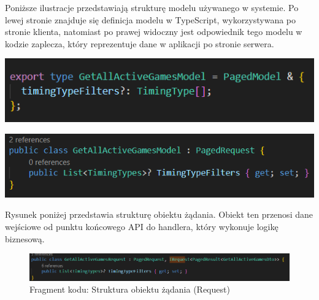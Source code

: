 \documentclass[twoside]{projektInzynierskiMS1}
\begin{document}
\newpage

\noindent
Poniższe ilustracje przedstawiają strukturę modelu używanego w systemie. Po lewej stronie znajduje się definicja modelu w TypeScript, wykorzystywana po stronie klienta, natomiast po prawej widoczny jest odpowiednik tego modelu w kodzie zaplecza, który reprezentuje dane w aplikacji po stronie serwera.

\vspace{0.5cm}
\begin{minipage}[t]{0.45\textwidth} 
    \vspace{0pt} 
    \centering 
    \includegraphics[width=\linewidth]{images/ex_model_front.png} 
\end{minipage} 
\hfill 
\begin{minipage}[t]{0.45\textwidth} 
    \vspace{0pt} 
    \centering 
    \includegraphics[width=\linewidth]{images/ex_model_back.png} 
\end{minipage} 
\vspace{0.5cm}

\noindent
Rysunek poniżej przedstawia strukturę obiektu żądania. Obiekt ten przenosi dane wejściowe od punktu końcowego API do handlera, który wykonuje logikę biznesową.

\vspace{0.5cm}
\begin{figure}[h!]
    \centering
    \includegraphics[width=1\textwidth]{images/ex_request_back.png}
    \caption{Fragment kodu: Struktura obiektu żądania (Request)}
\end{figure}
\vspace{0.5cm}
\end{document}
